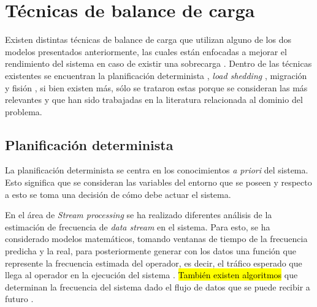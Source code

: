 \section{Técnicas de balance de carga}
\label{sec:tecnicasBC}

Existen distintas técnicas de balance de carga que utilizan alguno de los dos modelos presentados anteriormente, las cuales están enfocadas a mejorar el rendimiento del sistema en caso de existir una sobrecarga \citep{HirzelSSGG13}. Dentro de las técnicas existentes se encuentran la planificación determinista \citep{XuCTS14, DongTS07}, \textit{load shedding} \citep{SheuC09}, migración \citep{XingZH05} y fisión \citep{GulisanoJPSV12, IshiiS11, GedikSHW14, FernandezMKP13}, si bien existen más, sólo se trataron estas porque se consideran las más relevantes y que han sido trabajadas en la literatura relacionada al dominio del problema.

\subsection{Planificación determinista}
\label{sec:planificacionBC}

La planificación determinista se centra en los conocimientos \textit{a priori} del sistema. Esto significa que se consideran las variables del entorno que se poseen y respecto a esto se toma una decisión de cómo debe actuar el sistema. 

En el área de \textit{Stream processing} se ha realizado diferentes análisis de la estimación de frecuencia de \textit{data stream} en el sistema. Para esto, se ha considerado modelos matemáticos, tomando ventanas de tiempo de la frecuencia predicha y la real, para posteriormente generar con los datos una función que represente la frecuencia estimada del operador, es decir, el tráfico esperado que llega al operador en la ejecución del sistema \citep{Ganguly09}. \hl{También existen algoritmos} que determinan la frecuencia del sistema dado el flujo de datos que se puede recibir a futuro \citep{BhuvanagiriGKS06}.

